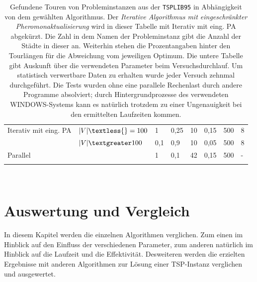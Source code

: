 \documentclass[doktyp=barbeit, sprache=german]{TUBAFarbeiten}
\begin{document}
\begin{landscape}
\begin{table}[]
{\begin{tabular}{ll|llllll}
Iterativ mit eing. PA & $|V| \textless{}= 100$ & 1     & 0,25 & 10                    & 0,15                      & 500               & 8                                                                                                 \\
                      & $|V| \textgreater 100$ & 0,1   & 0,9  & 10                    & 0,05                      & 500               & 8                                                                                                 \\ \hline
Parallel              &                      & 1     & 0,1  & 42                    & 0,15                      & 500               & -                                                                                                 \\ \bottomrule
\multicolumn{8}{l}{}  \\ 
\end{tabular}%
}
\\\caption{Gefundene Touren von Probleminstanzen aus der \texttt{TSPLIB95} in Abhängigkeit von dem gewählten Algorithmus. Der \textit{Iterative Algorithmus mit eingeschränkter Pheromonaktualisierung} wird in dieser Tabelle mit \glqq Iterativ mit eing. PA\grqq{} abgekürzt. Die Zahl in dem Namen der Probleminstanz gibt die Anzahl der Städte in dieser an. Weiterhin stehen die Prozentangaben hinter den Tourlängen für die Abweichung vom jeweiligen Optimum. Die untere Tabelle gibt Auskunft über die verwendeten Parameter beim Versuchsdurchlauf. Um statistisch verwertbare Daten zu erhalten wurde jeder Versuch zehnmal durchgeführt. Die Tests wurden ohne eine parallele Rechenlast durch andere Programme absolviert; durch Hintergrundprozesse des verwendeten WINDOWS-Systems kann es natürlich trotzdem zu einer Ungenauigkeit bei den ermittelten Laufzeiten kommen.}
\label{table1}
\end{table}
\end{landscape}
\section{Auswertung und Vergleich}
In diesem Kapitel werden die einzelnen Algorithmen verglichen. Zum einen im Hinblick auf den Einfluss der verschiedenen Parameter, zum anderen natürlich im Hinblick auf die Laufzeit und die Effektivität. Desweiteren werden die erzielten Ergebnisse mit anderen Algorithmen zur Lösung einer TSP-Instanz verglichen und ausgewertet.
\end{document}
